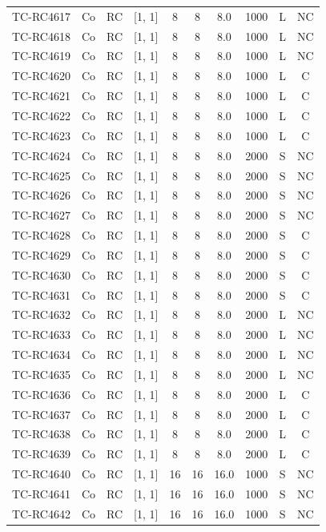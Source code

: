 \begin{longtable}{lccccccccc}
TC-RC4617 & Co & RC & [1, 1] & 8 & 8 & 8.0 & 1000 & L & NC \\
TC-RC4618 & Co & RC & [1, 1] & 8 & 8 & 8.0 & 1000 & L & NC \\
TC-RC4619 & Co & RC & [1, 1] & 8 & 8 & 8.0 & 1000 & L & NC \\
TC-RC4620 & Co & RC & [1, 1] & 8 & 8 & 8.0 & 1000 & L & C \\
TC-RC4621 & Co & RC & [1, 1] & 8 & 8 & 8.0 & 1000 & L & C \\
TC-RC4622 & Co & RC & [1, 1] & 8 & 8 & 8.0 & 1000 & L & C \\
TC-RC4623 & Co & RC & [1, 1] & 8 & 8 & 8.0 & 1000 & L & C \\
TC-RC4624 & Co & RC & [1, 1] & 8 & 8 & 8.0 & 2000 & S & NC \\
TC-RC4625 & Co & RC & [1, 1] & 8 & 8 & 8.0 & 2000 & S & NC \\
TC-RC4626 & Co & RC & [1, 1] & 8 & 8 & 8.0 & 2000 & S & NC \\
TC-RC4627 & Co & RC & [1, 1] & 8 & 8 & 8.0 & 2000 & S & NC \\
TC-RC4628 & Co & RC & [1, 1] & 8 & 8 & 8.0 & 2000 & S & C \\
TC-RC4629 & Co & RC & [1, 1] & 8 & 8 & 8.0 & 2000 & S & C \\
TC-RC4630 & Co & RC & [1, 1] & 8 & 8 & 8.0 & 2000 & S & C \\
TC-RC4631 & Co & RC & [1, 1] & 8 & 8 & 8.0 & 2000 & S & C \\
TC-RC4632 & Co & RC & [1, 1] & 8 & 8 & 8.0 & 2000 & L & NC \\
TC-RC4633 & Co & RC & [1, 1] & 8 & 8 & 8.0 & 2000 & L & NC \\
TC-RC4634 & Co & RC & [1, 1] & 8 & 8 & 8.0 & 2000 & L & NC \\
TC-RC4635 & Co & RC & [1, 1] & 8 & 8 & 8.0 & 2000 & L & NC \\
TC-RC4636 & Co & RC & [1, 1] & 8 & 8 & 8.0 & 2000 & L & C \\
TC-RC4637 & Co & RC & [1, 1] & 8 & 8 & 8.0 & 2000 & L & C \\
TC-RC4638 & Co & RC & [1, 1] & 8 & 8 & 8.0 & 2000 & L & C \\
TC-RC4639 & Co & RC & [1, 1] & 8 & 8 & 8.0 & 2000 & L & C \\
TC-RC4640 & Co & RC & [1, 1] & 16 & 16 & 16.0 & 1000 & S & NC \\
TC-RC4641 & Co & RC & [1, 1] & 16 & 16 & 16.0 & 1000 & S & NC \\
TC-RC4642 & Co & RC & [1, 1] & 16 & 16 & 16.0 & 1000 & S & NC \\

\end{longtable}
